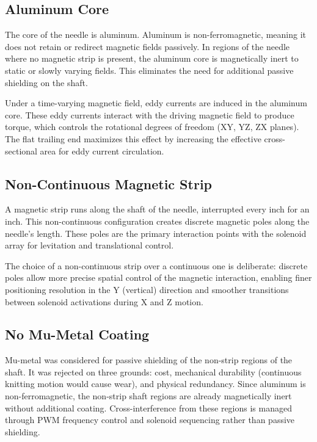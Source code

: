 \documentclass[12pt, a4paper]{article}
\begin{document}
\subsection{Aluminum Core}
The core of the needle is aluminum. Aluminum is non-ferromagnetic, meaning
it does not retain or redirect magnetic fields passively. In regions of the
needle where no magnetic strip is present, the aluminum core is magnetically
inert to static or slowly varying fields. This eliminates the need for
additional passive shielding on the shaft.

Under a time-varying magnetic field, eddy currents are induced in the
aluminum core. These eddy currents interact with the driving magnetic field
to produce torque, which controls the rotational degrees of freedom
(XY, YZ, ZX planes). The flat trailing end maximizes this effect by
increasing the effective cross-sectional area for eddy current circulation.

\subsection{Non-Continuous Magnetic Strip}
A magnetic strip runs along the shaft of the needle, interrupted every inch
for an inch. This non-continuous configuration creates discrete magnetic
poles along the needle's length. These poles are the primary interaction
points with the solenoid array for levitation and translational control.

The choice of a non-continuous strip over a continuous one is deliberate:
discrete poles allow more precise spatial control of the magnetic interaction,
enabling finer positioning resolution in the Y (vertical) direction and
smoother transitions between solenoid activations during X and Z motion.

\subsection{No Mu-Metal Coating}
Mu-metal was considered for passive shielding of the non-strip regions of
the shaft. It was rejected on three grounds: cost, mechanical durability
(continuous knitting motion would cause wear), and physical redundancy.
Since aluminum is non-ferromagnetic, the non-strip shaft regions are already
magnetically inert without additional coating. Cross-interference from these
regions is managed through PWM frequency control and solenoid sequencing
rather than passive shielding.

\end{document}
